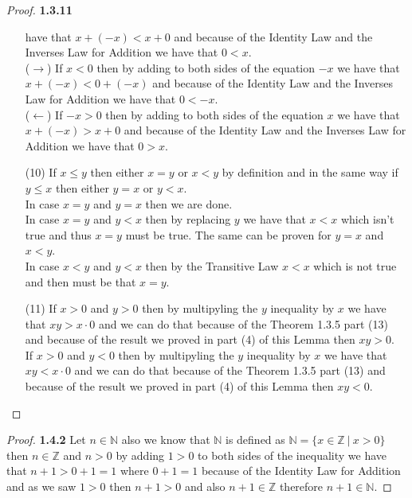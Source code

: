\documentclass[11pt]{article}
\newcommand{\N}{\mathbb{N}}
\newcommand{\Z}{\mathbb{Z}}
\theoremstyle{definition}
\begin{document}
\begin{proof}{\textbf{1.3.11}}
\begin{itemize}
        have that $x+ (-x) < x + 0$ and because of the Identity Law and the Inverses Law
        for Addition we have that $0 < x$.\\
        ($\rightarrow$) If $x < 0$ then by adding to both sides of the equation $-x$ we
        have that $x+ (-x) < 0 + (-x)$ and because of the Identity Law and the Inverses
        Law for Addition we have that $0 < -x$.\\
        ($\leftarrow$) If $-x > 0$ then by adding to both sides of the equation $x$ we
        have that $x+ (-x) > x + 0$ and because of the Identity Law and the Inverses
        Law for Addition we have that $0 > x$.
\cleardoublepage
        \item [(10)]
        If $x \leq y$ then either $x = y$ or $x < y$ by definition and in the same way
        if $y \leq x$ then either $y = x$ or $y < x$.\\
        In case $x=y$ and $y=x$ then we are done.\\
        In case $x = y$ and $y < x$ then by replacing $y$ we have that $x<x$ which isn't
        true and thus $x = y$ must be true. The same can be proven for $y=x$ and $x<y$.\\
        In case $x < y$ and $y < x$ then by the Transitive Law $x<x$ which is not true
        and then must be that $x=y$.
        \item [(11)]
        If $x >0$ and $y>0$ then by multipyling the $y$ inequality by $x$ we have that
        $xy > x \cdot 0$ and we can do that because of the Theorem 1.3.5 part (13) and
        because of the result we proved in part (4) of this Lemma then $xy>0$.\\
        If $x >0$ and $y<0$ then by multipyling the $y$ inequality by $x$ we have that
        $xy < x \cdot 0$ and we can do that because of the Theorem 1.3.5 part (13) and
        because of the result we proved in part (4) of this Lemma then $xy < 0$.
    \end{itemize}
    \end{proof}
    \begin{proof}{\textbf{1.4.2}}
        Let $n \in \N$ also we know that $\N$ is defined as $\N = \{x \in \Z ~|~ x > 0\}$ then
        $n \in \Z$ and $n > 0$ by adding $1 > 0$ to both sides of the inequality we have
        that $n +1 > 0 +1 = 1$ where $0 +1 = 1$ because of the Identity Law for Addition
        and as we saw $1>0$ then $n+1>0$ and also $n+1 \in \Z$ therefore $n+1 \in \N$.  
    \end{proof}
\end{document}
